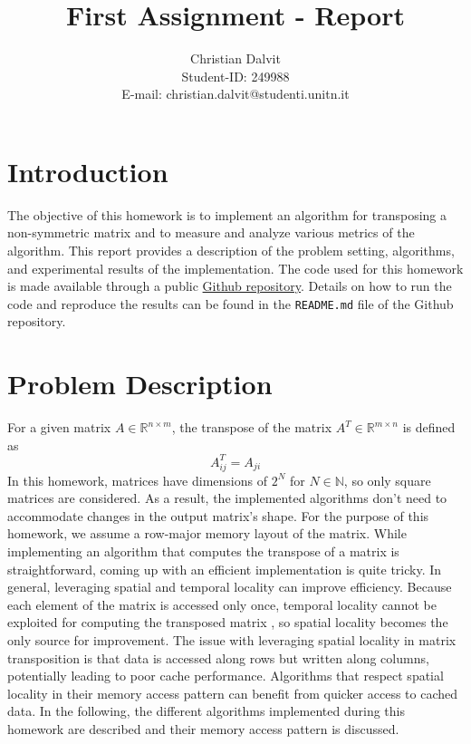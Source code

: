\documentclass{scrartcl}
\title{First Assignment - Report}
\author{
    Christian Dalvit\\
    {\small Student-ID: 249988}\\
    {\small E-mail: christian.dalvit@studenti.unitn.it}
}
\begin{document}
    \maketitle
    \thispagestyle{empty}
    \newpage

    \setcounter{page}{1}
    \section{Introduction}    
    The objective of this homework is to implement an algorithm for transposing a non-symmetric matrix and to measure and analyze various metrics of the algorithm. This report provides a description of the problem setting, algorithms, and experimental results of the implementation.
    The code used for this homework is made available through a public \href{https://github.com/chrisdalvit/matrix-transpose-benchmark}{Github repository}. Details on how to run the code and reproduce the results can be found in the \texttt{README.md} file of the Github repository.

    \section{Problem Description}
    For a given matrix $A \in \mathbb{R}^{n \times m}$, the transpose of the matrix $A^T \in \mathbb{R}^{m \times n}$ is defined as
    $$
        A^T_{ij} = A_{ji}
    $$
    In this homework, matrices have dimensions of $2^N$ for $N \in \mathbb{N}$, so only square matrices are considered. As a result, the implemented algorithms don't need to accommodate changes in the output matrix's shape. For the purpose of this homework, we assume a row-major memory layout of the matrix.
    While implementing an algorithm that computes the transpose of a matrix is straightforward, coming up with an efficient implementation is quite tricky. In general, leveraging spatial and temporal locality can improve efficiency. Because each element of the matrix is accessed only once, temporal locality cannot be exploited for computing the transposed matrix \cite{chatterjee2000cache}, so spatial locality becomes the only source for improvement. The issue with leveraging spatial locality in matrix transposition is that data is accessed along rows but written along columns, potentially leading to poor cache performance. Algorithms that respect spatial locality in their memory access pattern can benefit from quicker access to cached data. In the following, the different algorithms implemented during this homework are described and their memory access pattern is discussed.
\end{document}
